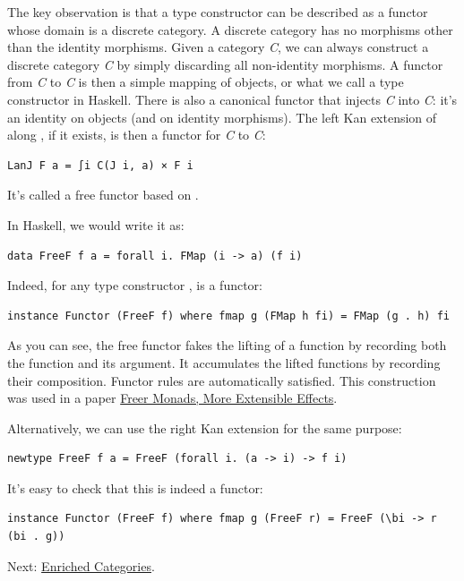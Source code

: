 The key observation is that a type constructor can be described as a
functor whose domain is a discrete category. A discrete category has no
morphisms other than the identity morphisms. Given a category \emph{C},
we can always construct a discrete category \emph{\textbar{}C\textbar{}}
by simply discarding all non-identity morphisms. A functor 
from \emph{\textbar{}C\textbar{}} to \emph{C} is then a simple mapping
of objects, or what we call a type constructor in Haskell. There is also
a canonical functor  that injects \emph{\textbar{}C\textbar{}}
into \emph{C}: it's an identity on objects (and on identity morphisms).
The left Kan extension of  along , if it exists, is
then a functor for \emph{C} to \emph{C}:

\begin{verbatim}
LanJ F a = ∫i C(J i, a) × F i
\end{verbatim}

It's called a free functor based on .

In Haskell, we would write it as:

\begin{verbatim}
data FreeF f a = forall i. FMap (i -> a) (f i)
\end{verbatim}

Indeed, for any type constructor ,  is a
functor:

\begin{verbatim}
instance Functor (FreeF f) where fmap g (FMap h fi) = FMap (g . h) fi
\end{verbatim}

As you can see, the free functor fakes the lifting of a function by
recording both the function and its argument. It accumulates the lifted
functions by recording their composition. Functor rules are
automatically satisfied. This construction was used in a paper
\href{http://okmij.org/ftp/Haskell/extensible/more.pdf}{Freer Monads,
More Extensible Effects}.

Alternatively, we can use the right Kan extension for the same purpose:

\begin{verbatim}
newtype FreeF f a = FreeF (forall i. (a -> i) -> f i)
\end{verbatim}

It's easy to check that this is indeed a functor:

\begin{verbatim}
instance Functor (FreeF f) where fmap g (FreeF r) = FreeF (\bi -> r (bi . g))
\end{verbatim}

Next:
\href{https://bartoszmilewski.com/2017/05/13/enriched-categories/}{Enriched
Categories}.
